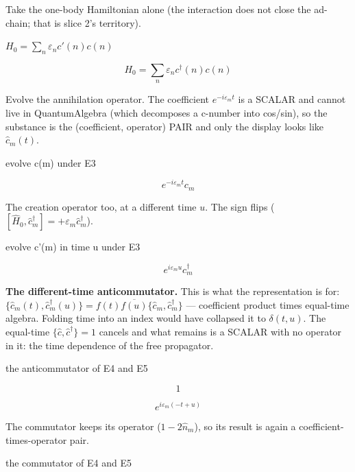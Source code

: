 \documentclass[dvipdfmx]{article}
\begin{document}
Take the one-body Hamiltonian alone (the interaction does not close the ad-chain; that is slice 2's territory).

$H_0 = \sum_n \varepsilon_n c'(n) c(n)$

\begin{equation}
  H_0 = \sum_n \varepsilon_n c^{\dagger}(n) c(n)
  \label{eq:E3}
\end{equation}

Evolve the annihilation operator. The coefficient $e^{-i\varepsilon_m t}$ is a SCALAR and cannot live in QuantumAlgebra (which decomposes a c-number into cos/sin), so the substance is the (coefficient, operator) PAIR and only the display looks like $\hat c_m(t)$.

evolve c(m) under E3

\begin{equation}
  e^{- i \varepsilon_{m} t} c_{m}
  \label{eq:E4}
\end{equation}

The creation operator too, at a different time $u$. The sign flips ($[\hat H_0,\hat c^\dagger_m]=+\varepsilon_m\hat c^\dagger_m$).

evolve c'(m) in time u under E3

\begin{equation}
  e^{i \varepsilon_{m} u} c^{\dagger}_{m}
  \label{eq:E5}
\end{equation}

\textbf{The different-time anticommutator.} This is what the representation is for: $\{\hat c_m(t),\hat c^\dagger_m(u)\}=f(t)\overline{f(u)}\{\hat c_m,\hat c^\dagger_m\}$ — coefficient product times equal-time algebra. Folding time into an index would have collapsed it to $\delta(t,u)$. The equal-time $\{\hat c,\hat c^\dagger\}=1$ cancels and what remains is a SCALAR with no operator in it: the time dependence of the free propagator.

the anticommutator of E4 and E5

\begin{equation}
  1
  \label{eq:E6}
\end{equation}

\begin{equation}
  e^{i \varepsilon_{m} \left(- t + u\right)}
  \label{eq:E7}
\end{equation}

The commutator keeps its operator ($1-2\hat n_m$), so its result is again a coefficient-times-operator pair.

the commutator of E4 and E5
\end{document}
